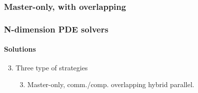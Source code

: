 \subsubsection{Master-only, with overlapping}
\begin{frame}
  \frametitle{N-dimension PDE solvers}
  \framesubtitle{Solutions}
  \begin{enumerate}
    \setcounter{enumi}{2}
    \item Three type of strategies
    \begin{enumerate}
      \setcounter{enumi}{2}
      \item Master-only, comm./comp. overlapping hybrid parallel.
    \end{enumerate}
  \end{enumerate}

  \begin{figure}[htbp]
    \centering
\end{figure}
\end{frame}
